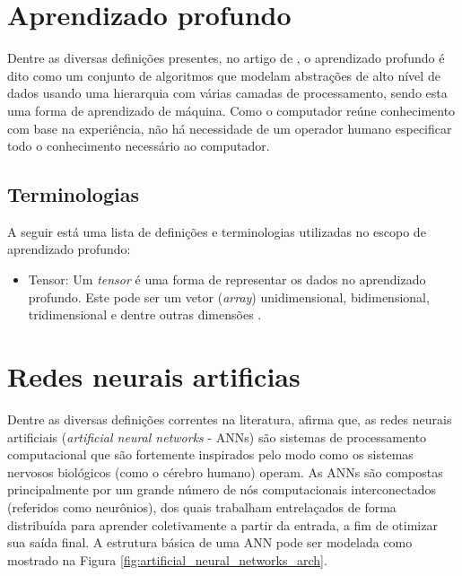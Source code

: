 \documentclass[
	12pt,				%
	oneside,			%
	a4paper,			%
	english,			%
	brazil				%
	]{abntex2ppgsi}
\begin{document}
\section{Aprendizado profundo}
Dentre as diversas definições presentes, no artigo de , o aprendizado profundo é dito como um conjunto de algoritmos que modelam abstrações de alto nível de dados usando uma hierarquia com várias camadas de processamento, sendo esta uma forma de aprendizado de máquina. Como o computador reúne conhecimento com base na experiência, não há necessidade de um operador humano especificar todo o conhecimento necessário ao computador.

\subsection{Terminologias}
A seguir está uma lista de definições e terminologias utilizadas no escopo de aprendizado profundo:

\begin{itemize}
  \item Tensor: Um \textit{tensor} é uma forma de representar os dados no aprendizado profundo. Este pode ser um vetor (\textit{array}) unidimensional, bidimensional, tridimensional e dentre outras dimensões \cite{kolda2009tensor}.
\end{itemize}

\section{Redes neurais artificias}
Dentre as diversas definições correntes na literatura,  afirma que, as redes neurais artificiais (\textit{artificial neural networks} - ANNs) são sistemas de processamento computacional que são fortemente inspirados pelo modo como os sistemas nervosos biológicos (como o cérebro humano) operam. As ANNs são compostas principalmente por um grande número de nós computacionais interconectados (referidos como neurônios), dos quais trabalham entrelaçados de forma distribuída para aprender coletivamente a partir da entrada, a fim de otimizar sua saída final. A estrutura básica de uma ANN pode ser modelada como mostrado na Figura \ref{fig:artificial_neural_networks_arch}. 
\end{document}
